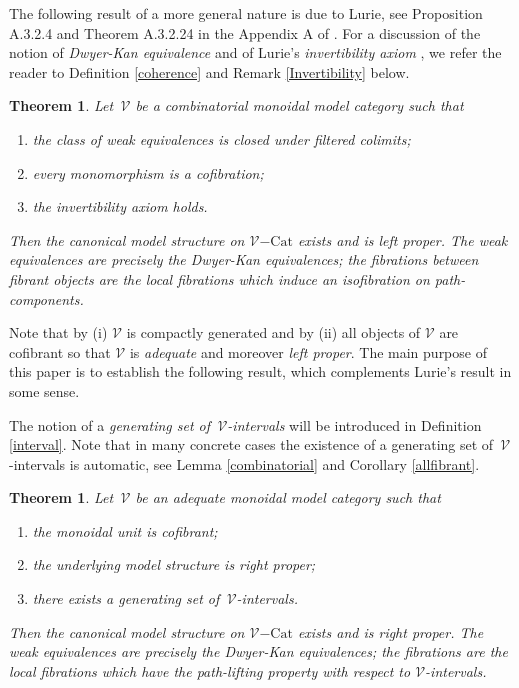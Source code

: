 \documentclass[10pt]{amsart}
\theoremstyle{plain}
\newtheorem{thm}[subsection]{Theorem}
\theoremstyle{remark}
\def\Vv{\mathcal{V}}
\def\Cat{\mathrm{Cat}}
\def\VCat{\Vv\mathrm{-}\Cat}
\begin{document}
The following result of a more general nature is due to Lurie, see Proposition A.3.2.4 and Theorem A.3.2.24 in the Appendix A of \cite{Lu}. For a discussion of the notion of \emph{Dwyer-Kan equivalence} and of Lurie's \emph{invertibility axiom} \cite[A.3.2.12]{Lu}, we refer the reader to Definition \ref{coherence} and Remark \ref{Invertibility} below.

\begin{thm}\label{Lurie}Let $\,\Vv$ be a combinatorial monoidal model category such that\begin{enumerate}\item[(i)]the class of weak equivalences is closed under filtered colimits;\item[(ii)]every monomorphism is a cofibration;\item[(iii)]the invertibility axiom  holds.\end{enumerate}Then the canonical model structure on $\VCat$ exists and is left proper. The weak equivalences are precisely the Dwyer-Kan equivalences; the fibrations between fibrant objects are the local fibrations which induce an isofibration on path-components.\end{thm}

Note that by (i) $\Vv$ is compactly generated and by (ii) all objects of $\Vv$ are cofibrant so that $\Vv$ is \emph{adequate} and moreover \emph{left proper}. The main purpose of this paper is to establish the following result, which complements Lurie's result in some sense.

The notion of a \emph{generating set of $\,\Vv$-intervals} will be introduced in Definition \ref{interval}. Note that in many concrete cases the existence of a generating set of $\,\Vv$-intervals is automatic, see Lemma \ref{combinatorial} and Corollary \ref{allfibrant}.

\begin{thm}\label{canonical}Let $\,\Vv$ be an adequate monoidal model category such that

\begin{enumerate}\item[(i)]the monoidal unit is cofibrant;\item[(ii)]the underlying model structure is right proper;\item[(iii)]there exists a generating set of $\,\Vv$-intervals.\end{enumerate}Then the canonical model structure on $\VCat$ exists and is right proper. The weak equivalences are precisely the Dwyer-Kan equivalences; the fibrations are the local fibrations which have the path-lifting property with respect to $\Vv$-intervals.\end{thm}
\end{document}
